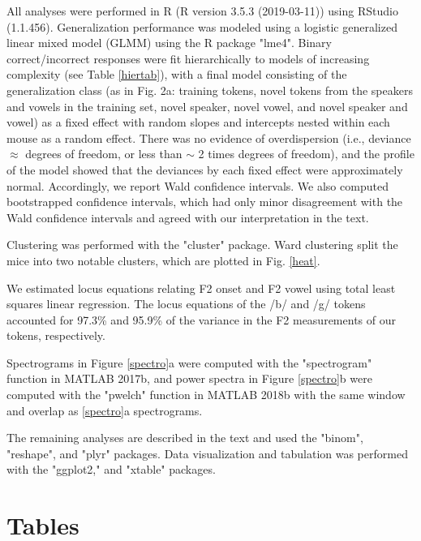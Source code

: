 All analyses were performed in R (R version 3.5.3 (2019-03-11))\citep{Team2016} using RStudio (1.1.456)\citep{Team2015}. Generalization performance was modeled using a logistic generalized linear mixed model (GLMM) using the R package "lme4"\citep{Bates2015}. Binary correct/incorrect responses were fit hierarchically to models of increasing complexity (see Table \ref{hiertab}), with a final model consisting of the generalization class (as in Fig. 2a: training tokens, novel tokens from the speakers and vowels in the training set, novel speaker, novel vowel, and novel speaker and vowel) as a fixed effect with random slopes and intercepts nested within each mouse as a random effect. There was no evidence of overdispersion (i.e., deviance $\approx$ degrees of freedom, or less than  $\sim$ 2 times degrees of freedom), and the profile of the model showed that the deviances by each fixed effect were approximately normal. Accordingly, we report Wald confidence intervals. We also computed bootstrapped confidence intervals, which had only minor disagreement with the Wald confidence intervals and agreed with our interpretation in the text.

Clustering was performed with the "cluster"\citep{Maechler2017} package. Ward clustering split the mice into two notable clusters, which are plotted in Fig. \ref{heat}.

We estimated locus equations relating F2 onset and F2 vowel using total least squares linear regression. The locus equations of the /b/ and /g/ tokens accounted for 97.3\% and 95.9\% of the variance in the F2 measurements of our tokens, respectively.

Spectrograms in Figure \ref{spectro}a were computed with the "spectrogram" function in MATLAB 2017b, and power spectra in Figure \ref{spectro}b were computed with the "pwelch" function in MATLAB 2018b with the same window and overlap as \ref{spectro}a spectrograms.

The remaining analyses are described in the text and used the "binom"\citep{Sundar2014}, "reshape"\citep{wickhamReshapingDataReshape2007a}, and "plyr"\citep{Wickham2011} packages. Data visualization and tabulation was performed with the "ggplot2,"\citep{Wickham2009} and "xtable"\citep{Dahl2016} packages.



%


\section{Tables}

